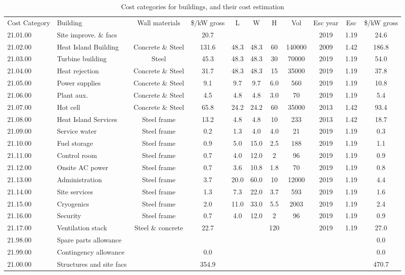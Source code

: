 \begin{table}[h!] 
    \begin{tiny}
    \centering
    \begin{tabular}{l l  c c c c c c c c c }
Cost Category	&	Building	&	Wall materials	&	 \$/kW gross	&	L	&	W	&	H	&	Vol	&	Esc year	&	Esc	&\$/kW gross	\\
21.01.00	&	Site improve. \& facs	&		&	20.7	&		&		&		&		&	2019	&	1.19	&	24.6	\\
21.02.00	&	Heat Island Building	&	Concrete \& Steel	&	131.6	&	48.3	&	48.3	&	60	&	140000	&	2009	&	1.42	&	186.8	\\
21.03.00	&	Turbine building	&	Steel 	&	45.3	&	48.3	&	48.3	&	30	&	70000	&	2019	&	1.19	&	54.0	\\
21.04.00	&	Heat rejection 	&	Concrete \& Steel	&	31.7	&	48.3	&	48.3	&	15	&	35000	&	2019	&	1.19	&	37.8	\\
21.05.00	&	Power supplies	&	Concrete \& Steel	&	9.1	&	9.7	&	9.7	&	6.0	&	560	&	2019	&	1.19	&	10.8	\\
21.06.00	&	Plant aux.	&	Concrete \& Steel	&	4.5	&	4.8	&	4.8	&	3.0	&	70	&	2019	&	1.19	&	5.4	\\
21.07.00	&	Hot cell	&	Concrete \& Steel	&	65.8	&	24.2	&	24.2	&	60	&	35000	&	2013	&	1.42	&	93.4	\\
21.08.00	&	Heat Island Services	&	Steel frame	&	13.2	&	4.8	&	4.8	&	10	&	233	&	2013	&	1.42	&	18.7	\\
21.09.00	&	Service water	&	Steel frame	&	0.2	&	1.3	&	4.0	&	4.0	&	21	&	2019	&	1.19	&	0.3	\\
21.10.00	&	Fuel storage	&	Steel frame	&	0.9	&	5.0	&	15.0	&	2.5	&	188	&	2019	&	1.19	&	1.1	\\
21.11.00	&	Control room	&	Steel frame	&	0.7	&	4.0	&	12.0	&	2	&	96	&	2019	&	1.19	&	0.9	\\
21.12.00	&	Onsite AC power	&	Steel frame	&	0.7	&	3.6	&	10.8	&	1.8	&	70	&	2019	&	1.19	&	0.8	\\
21.13.00	&	Administration	&	Steel frame	&	3.7	&	20.0	&	60.0	&	10	&	12000	&	2019	&	1.19	&	4.4	\\
21.14.00	&	Site services	&	Steel frame	&	1.3	&	7.3	&	22.0	&	3.7	&	593	&	2019	&	1.19	&	1.6	\\
21.15.00	&	Cryogenics	&	Steel frame	&	2.0	&	11.0	&	33.0	&	5.5	&	2003	&	2019	&	1.19	&	2.4	\\
21.16.00	&	Security	&	Steel frame	&	0.7	&	4.0	&	12.0	&	2	&	96	&	2019	&	1.19	&	0.9	\\
21.17.00	&	Ventilation stack	&	Steel \& concrete 	&	22.7	&		&		&	120	&		&	2019	&	1.19	&	27.0	\\
21.98.00	&	Spare parts allowance	&		&		&		&		&		&		&		&		&	0.0	\\
21.99.00	&	Contingency allowance	&		&	0.0	&		&		&		&		&		&		&	0.0	\\
21.00.00	&	Structures and site facs	&		&	354.9	&		&		&		&		&		&		&	470.7	\\
    \end{tabular}															
    \end{tiny} 																	
    \caption{Cost categories for buildings, and their cost estimation}	
    \label{tab:buildings}
\end{table} 
